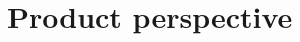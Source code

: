 \documentclass[../../rasd.tex]{subfiles}
\begin{document}
	
	\section{Product perspective}

		
\end{document}
